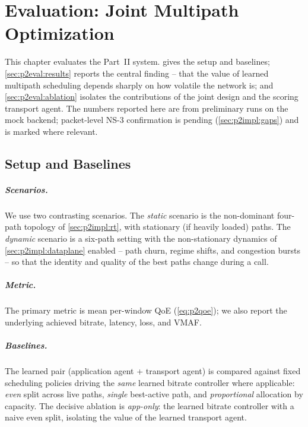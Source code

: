 \chapter{Evaluation: Joint Multipath Optimization}
\label{ch:p2eval}

This chapter evaluates the Part~II system.  gives the setup and baselines;
\cref{sec:p2eval:results} reports the central finding -- that the value of learned multipath scheduling
depends sharply on how volatile the network is; and \cref{sec:p2eval:ablation} isolates the contributions
of the joint design and the scoring transport agent. The numbers reported here are from preliminary runs
on the mock backend; packet-level NS-3 confirmation is pending (\cref{sec:p2impl:gaps}) and is marked
where relevant.

\section{Setup and Baselines}
\label{sec:p2eval:setup}

\paragraph{Scenarios.} We use two contrasting scenarios. The \emph{static} scenario is the non-dominant
four-path topology of \cref{sec:p2impl:rt}, with stationary (if heavily loaded) paths. The \emph{dynamic}
scenario is a six-path setting with the non-stationary dynamics of \cref{sec:p2impl:dataplane} enabled --
path churn, regime shifts, and congestion bursts -- so that the identity and quality of the best paths
change during a call.

\paragraph{Metric.} The primary metric is mean per-window QoE (\cref{eq:p2qoe}); we also report the
underlying achieved bitrate, latency, loss, and VMAF.

\paragraph{Baselines.} The learned pair (application agent + transport agent) is compared against fixed
scheduling policies driving the \emph{same} learned bitrate controller where applicable: \emph{even}
split across live paths, \emph{single} best-active path, and \emph{proportional} allocation by capacity.
The decisive ablation is \emph{app-only}: the learned bitrate controller with a naive even split,
isolating the value of the learned transport agent.

